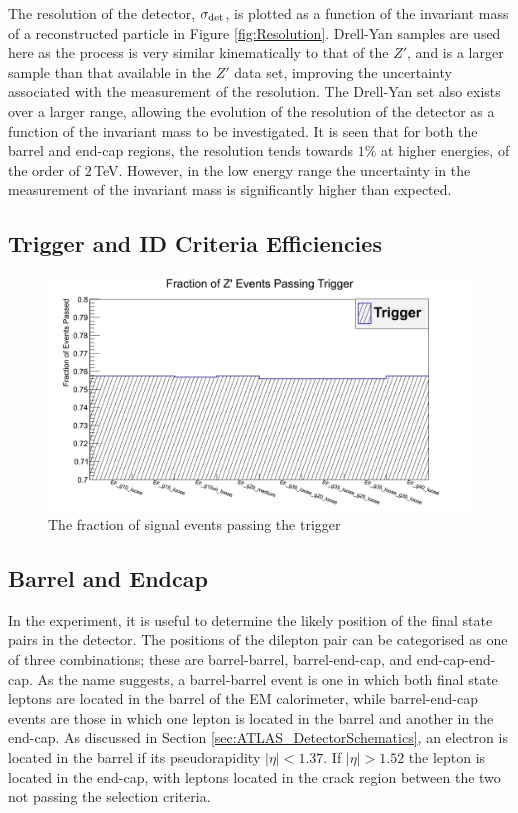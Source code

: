 \documentclass{article}
\begin{document}
The resolution of the detector, $\sigma_{\rm{det}}$, is plotted as a function of the invariant mass of a reconstructed particle in Figure \ref{fig:Resolution}. Drell-Yan samples are used here as the process is very similar kinematically to that of the $Z'$, and is a larger sample than that available in the $Z'$ data set, improving the uncertainty associated with the measurement of the resolution. The Drell-Yan set also exists over a larger range, allowing the evolution of the resolution of the detector as a function of the invariant mass to be investigated. It is seen that for both the barrel and end-cap regions, the resolution tends towards $1\%$ at higher energies, of the order of $2\,$TeV. However, in the low energy range the uncertainty in the measurement of the invariant mass is significantly higher than expected.

\subsection{Trigger and ID Criteria Efficiencies}

\begin{figure}[h]
    \centering \includegraphics[scale=0.3]{images/TriggerZ.png} \caption{ The fraction of signal events passing the trigger \label{fig:TriggerZ} }
\end{figure}

\subsection{Barrel and Endcap}

In the experiment, it is useful to determine the likely position of the final state pairs in the detector. The positions of the dilepton pair can be categorised as one of three combinations; these are barrel-barrel, barrel-end-cap, and end-cap-end-cap. As the name suggests, a barrel-barrel event is one in which both final state leptons are located in the barrel of the EM calorimeter, while barrel-end-cap events are those in which one lepton is located in the barrel and another in the end-cap. As discussed in Section \ref{sec:ATLAS_DetectorSchematics}, an electron is located in the barrel if its pseudorapidity $|\eta|<1.37$. If $|\eta|>1.52$ the lepton is located in the end-cap, with leptons located in the crack region between the two not passing the selection criteria.
\end{document}
